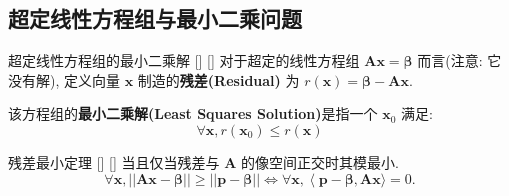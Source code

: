 \documentclass[UTF8]{ctexart}
\DeclareMathOperator{\0}{\mathbf{0}}
\DeclareMathOperator{\<}{\langle}
\renewcommand{\>}{\rangle}
\begin{document}
	
	\subsection{超定线性方程组与最小二乘问题}
	
		\begin{dfn}
			[]
			{超定线性方程组的最小二乘解}
			[]
			[]
			对于超定的线性方程组 \(\bm{A}\bm{x}=\bm{\beta}\) 而言(注意: 它没有解), 定义向量 \(\bm{x}\) 制造的\textbf{残差(Residual)} 为 \(r(\bm{x})=\bm{\beta}-\bm{A}\bm{x}\). 
			
			该方程组的\textbf{最小二乘解(Least Squares Solution)}是指一个 \(\bm{x}_0\) 满足: 
			\[\forall \bm{x}, r(\bm{x}_0)\leq r(\bm{x})\]
		\end{dfn}
	
		\begin{thm}
			[]
			{残差最小定理}
			[]
			[]
			当且仅当残差与 \(\bm{A}\) 的像空间正交时其模最小. 
			\[\forall\bm{x}, ||\bm{A}\bm{x}-\bm{\beta}||\geq||\bm{p}-\bm{\beta}||\Longleftrightarrow \forall\bm{x}, \<\bm{p}-\bm{\beta},\bm{A}\bm{x}\>=0. \]
		\end{thm}
		
\end{document}

